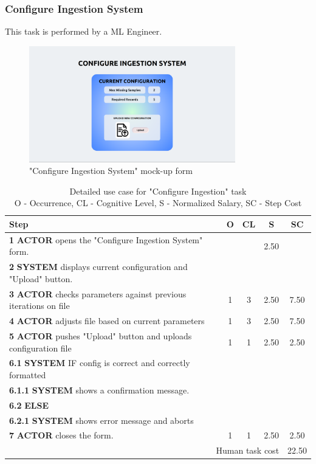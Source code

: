 \subsubsection{Configure Ingestion System}

This task is performed by a ML Engineer.

\begin{figure}[H]
\centering
\includegraphics[width=0.8\textwidth]{figures/ui_configure_ingestion.png}
\caption{"Configure Ingestion System" mock-up form}
\end{figure}

\begin{table}[H]
\centering
\begin{tabularx}{\textwidth}{|X|c|c|c|c|}
\hline
\textbf{Step} & \textbf{O} & \textbf{CL} & \textbf{S} & \textbf{SC} \\
\hline
\textbf{1} \textbf{ACTOR} opens the "Configure Ingestion System" form. &  & & 2.50 & \\
\hline
\textbf{2} \textbf{SYSTEM} displays current configuration and "Upload" button. & & & & \\
\hline
\textbf{3} \textbf{ACTOR} checks parameters against previous iterations on file & 1 & 3 & 2.50 & 7.50 \\
\hline
\textbf{4} \textbf{ACTOR} adjusts file based on current parameters & 1 & 3 & 2.50 & 7.50 \\
\hline
\textbf{5} \textbf{ACTOR} pushes "Upload" button and uploads configuration file & 1 & 1 & 2.50 & 2.50 \\
\hline
\textbf{6.1} \textbf{SYSTEM} IF config is correct and correctly formatted & & & & \\
\hline
\textbf{6.1.1} \textbf{SYSTEM} shows a confirmation message. & & & & \\
\hline
\textbf{6.2} \textbf{ELSE} & & & & \\
\hline
\textbf{6.2.1} \textbf{SYSTEM} shows error message and aborts & & & & \\
\hline
\textbf{7} \textbf{ACTOR} closes the form. & 1 & 1 & 2.50 & 2.50 \\
\hline
\multicolumn{4}{|r|}{Human task cost} & 22.50 \\
\hline
\end{tabularx}
\caption{Detailed use case for "Configure Ingestion" task\\ 
O - Occurrence, CL - Cognitive Level, S - Normalized Salary, SC - Step Cost}
\label{table:configure_ingestion_system}
\end{table}

